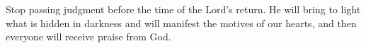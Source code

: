 
\lettrine{S}{}top passing judgment before the time of the Lord's return. He will bring to light what is hidden in darkness and will manifest the motives of our hearts, and then everyone will receive praise from God.